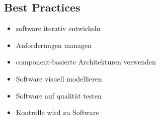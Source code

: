 \subsection{Best Practices}
\begin{itemize}
    \item software iterativ entwickeln
    \item Anforderungen managen
    \item component-basierte Architekturen verwenden
    \item Software visuell modellieren
    \item Software auf qualität testen
    \item Kontrolle wird zu Software
\end{itemize}
